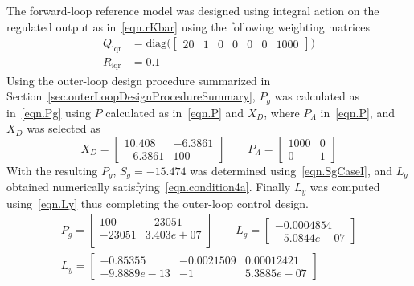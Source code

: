The forward-loop reference model was designed using integral action on the regulated output as in\ \eqref{eqn.rKbar} using the following weighting matrices
\begin{equation*}
  \begin{split}
    Q_{\text{lqr}}
    &=
    \text{diag}\bigr(
    \begin{bmatrix}
      20 & 1 & 0 & 0 & 0 & 0 & 1000
    \end{bmatrix}
    \bigr) \\
    R_{\text{lqr}}
    &=
    0.1
  \end{split}
\end{equation*}
Using the outer-loop design procedure summarized in Section~\ref{sec.outerLoopDesignProcedureSummary}, $P_{g}$ was calculated as in\ \eqref{eqn.Pg} using $P$ calculated as in\ \eqref{eqn.P} and $X_{D}$, where $P_{\Lambda}$ in\ \eqref{eqn.P}, and $X_{D}$ was selected as
\begin{equation*}
  X_{D}
  =
  \begin{bmatrix}
    10.408 & -6.3861 \\
    -6.3861 & 100
  \end{bmatrix}
  \qquad
  P_{\Lambda}
  =
  \begin{bmatrix}
    1000 & 0 \\
    0 & 1
  \end{bmatrix}
\end{equation*}
With the resulting $P_{g}$, $S_{g}=-15.474$ was determined using\ \eqref{eqn.SgCaseI}, and $L_{g}$ obtained numerically satisfying\ \eqref{eqn.condition4a}.
Finally $L_{y}$ was computed using\ \eqref{eqn.Ly} thus completing the outer-loop control design.
\begin{equation*}
  \begin{gathered}
    P_{g} =
    \begin{bmatrix}
      100 & -23051 \\
      -23051 & 3.403e+07 \\
    \end{bmatrix}
    \qquad
    L_{g} =
    \begin{bmatrix}
      -0.0004854 \\
      -5.0844e-07
    \end{bmatrix} \\
    L_{y} =
    \begin{bmatrix}
      -0.85355 & -0.0021509 & 0.00012421 \\
      -9.8889e-13 & -1 & 5.3885e-07
    \end{bmatrix}
  \end{gathered}
\end{equation*}
